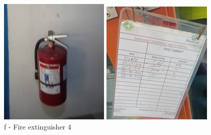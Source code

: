 \begin{figure}[!htb]
\begin{minipage}[b]{0.22\linewidth}
		\includegraphics[width=\textwidth]{figures/ch05_fdas_sd12}
		\caption*{f - Fire extinguisher 4}
	\end{minipage}
	\hspace{0.03cm}
	\begin{minipage}[b]{0.22\linewidth}
		\centering
		\includegraphics[width=\textwidth]{figures/ch05_fdas_sd13}

\end{minipage}
\end{figure}
